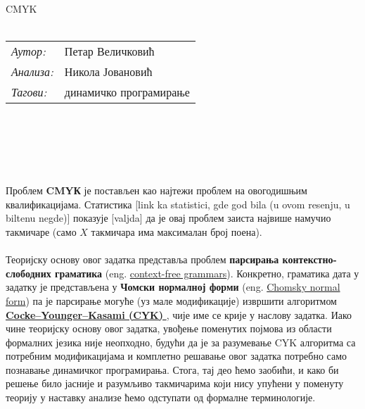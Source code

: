 \documentclass[a4wide]{article}
\begin{document}
 CMYK\\ \\
%
\begin{tabular}{l l}
{\it Аутор:} & Петар Величковић\\
{\it Анализа:} & Никола Јовановић\\
{\it Тагови:} & динамичко програмирање\\
\end{tabular}\\ \\ \\
%

\\

\\ \linebreak
Проблем {\bf CMYК} је постављен као најтежи проблем на овогодишњим квалификацијама. Статистика [link ka statistici, gde god bila (u ovom resenju, u biltenu negde)] показује [valjda] да је овај проблем заиста највише намучио такмичаре (само $X$ такмичара има максималан број поена). \\
\\
Теоријску основу овог задатка представља проблем {\bf парсирања контекстно-слободних граматика} (eng. \href{https://en.wikipedia.org/wiki/Context-free_grammar}{context-free grammars}). Конкретно, граматика дата у задатку је представљена у {\bf Чомски нормалној форми} (eng. \href{https://en.wikipedia.org/wiki/Chomsky_normal_form}{ Chomsky normal form}) па је парсирање могуће (уз мале модификације) извршити алгоритмом \href{https://en.wikipedia.org/wiki/CYK_algorithm}{ \bf{ Cocke–Younger–Kasami (CYK)} }, чије име се крије у наслову задатка. Иако чине теоријску основу овог задатка, увођење поменутих појмова из области формалних језика није неопходно, будући да је за разумевање CYK алгоритма са потребним модификацијама и комплетно решавање овог задатка потребно само познавање динамичког програмирања. Стога, тај део ћемо заобићи, и како би решење било јасније и разумљиво такмичарима који нису упућени у поменуту теорију у наставку анализе ћемо одступати од формалне терминологије. \\

\\
\end{document}
